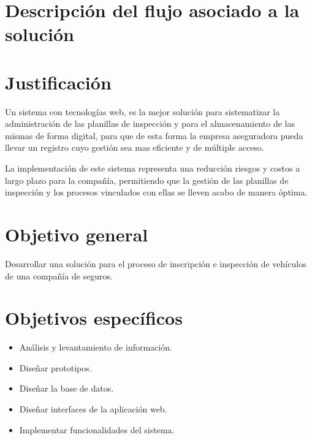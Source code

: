 \setlength{\parskip}{0mm}



\section{Descripción del flujo asociado a la solución}



\section{Justificación}


Un sistema con tecnologías web, es la mejor solución para sistematizar la administración de las planillas de inspección y para el almacenamiento de las mismas de forma digital, para que de esta forma la empresa aseguradora pueda llevar un registro cuyo gestión sea mas eficiente y de múltiple acceso.

La implementación de este sistema representa una reducción riesgos y costos a largo plazo para la compañía, permitiendo que la gestión de las planillas de inspección y los procesos vinculados con ellas se lleven acabo de manera óptima.


\section{Objetivo general}

Desarrollar una solución para el proceso de inscripción e inspección de vehículos de una compañía de seguros.

\section{Objetivos específicos}

\begin{itemize}

	
	
	\item Análisis y levantamiento de información.

	\item Diseñar prototipos.

	\item Diseñar la base de datos.

	\item Diseñar interfaces de la aplicación web.

	\item Implementar funcionalidades del sistema.
	
	

\end{itemize}



